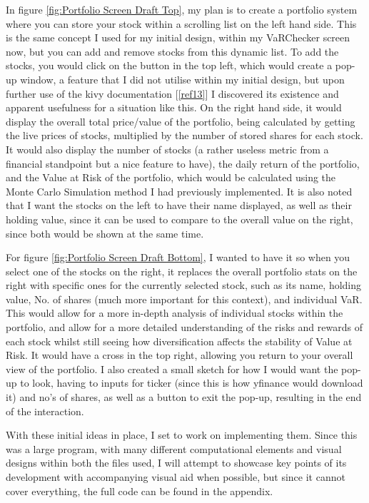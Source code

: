 \documentclass{article}
\begin{document}
In figure \ref{fig:Portfolio Screen Draft Top}, my plan is to create a portfolio system where you can store your stock within a scrolling list on the left hand side. This is the same concept I used for my initial design, within my VaRChecker screen now, but you can add and remove stocks from this dynamic list. To add the stocks, you would click on the button in the top left, which would create a pop-up window, a feature that I did not utilise within my initial design, but upon further use of the kivy documentation [\ref{ref13}] I discovered its existence and apparent usefulness for a situation like this. On the right hand side, it would display the overall total price/value of the portfolio, being calculated by getting the live prices of stocks, multiplied by the number of stored shares for each stock. It would also display the number of stocks (a rather useless metric from a financial standpoint but a nice feature to have), the daily return of the portfolio, and the Value at Risk of the portfolio, which would be calculated using the Monte Carlo Simulation method I had previously implemented. It is also noted that I want the stocks on the left to have their name displayed, as well as their holding value, since it can be used to compare to the overall value on the right, since both would be shown at the same time.\\\vspace{0.3cm}

For figure \ref{fig:Portfolio Screen Draft Bottom}, I wanted to have it so when you select one of the stocks on the right, it replaces the overall portfolio stats on the right with specific ones for the currently selected stock, such as its name, holding value, No. of shares (much more important for this context), and individual VaR. This would allow for a more in-depth analysis of individual stocks within the portfolio, and allow for a more detailed understanding of the risks and rewards of each stock whilst still seeing how diversification affects the stability of Value at Risk. It would have a cross in the top right, allowing you return to your overall view of the portfolio. I also created a small sketch for how I would want the pop-up to look, having to inputs for ticker (since this is how yfinance would download it) and no's of shares, as well as a button to exit the pop-up, resulting in the end of the interaction.\\\vspace{0.3cm}

With these initial ideas in place, I set to work on implementing them. Since this was a large program, with many different computational elements and visual designs within both the files used, I will attempt to showcase key points of its development with accompanying visual aid when possible, but since it cannot cover everything, the full code can be found in the appendix.\\\vspace{0.3cm}
\end{document}
